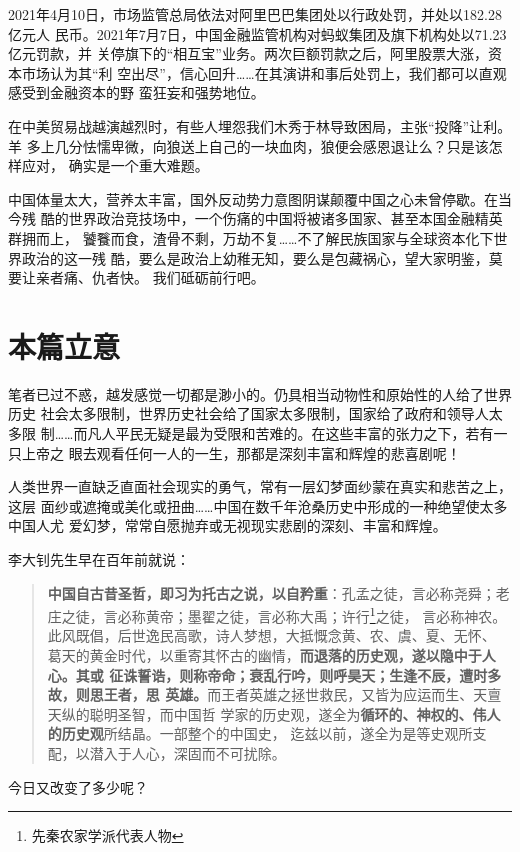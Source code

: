 2021年4月10日，市场监管总局依法对阿里巴巴集团处以行政处罚，并处以182.28亿元人
民币。2021年7月7日，中国金融监管机构对蚂蚁集团及旗下机构处以71.23亿元罚款，并
关停旗下的“相互宝”业务。两次巨额罚款之后，阿里股票大涨，资本市场认为其“利
空出尽”，信心回升……在其演讲和事后处罚上，我们都可以直观感受到金融资本的野
蛮狂妄和强势地位。


在中美贸易战越演越烈时，有些人埋怨我们木秀于林导致困局，主张“投降”让利。羊
多上几分怯懦卑微，向狼送上自己的一块血肉，狼便会感恩退让么？只是该怎样应对，
确实是一个重大难题。

中国体量太大，营养太丰富，国外反动势力意图阴谋颠覆中国之心未曾停歇。在当今残
酷的世界政治竞技场中，一个伤痛的中国将被诸多国家、甚至本国金融精英群拥而上，
饕餮而食，渣骨不剩，万劫不复……不了解民族国家与全球资本化下世界政治的这一残
酷，要么是政治上幼稚无知，要么是包藏祸心，望大家明鉴，莫要让亲者痛、仇者快。
我们砥砺前行吧。

\section{本篇立意}

笔者已过不惑，越发感觉一切都是渺小的。仍具相当动物性和原始性的人给了世界历史
社会太多限制，世界历史社会给了国家太多限制，国家给了政府和领导人太多限
制……而凡人平民无疑是最为受限和苦难的。在这些丰富的张力之下，若有一只上帝之
眼去观看任何一人的一生，那都是深刻丰富和辉煌的悲喜剧呢！


人类世界一直缺乏直面社会现实的勇气，常有一层幻梦面纱蒙在真实和悲苦之上，这层
面纱或遮掩或美化或扭曲……中国在数千年沧桑历史中形成的一种绝望使太多中国人尤
爱幻梦，常常自愿抛弃或无视现实悲剧的深刻、丰富和辉煌。

李大钊先生早在百年前就说：
\begin{quotation}
  \textbf{中国自古昔圣哲，即习为托古之说，以自矜重}：孔孟之徒，言必称尧舜；老
  庄之徒，言必称黄帝；墨翟之徒，言必称大禹；许行\footnote{先秦农家学派代表人物}之徒，
  言必称神农。此风既倡，后世逸民高歌，诗人梦想，大抵慨念黄、农、虞、夏、无怀、
  葛天的黄金时代，以重寄其怀古的幽情，\textbf{而退落的历史观，遂以隐中于人心。其或
    征诛誓诰，则称帝命；衰乱行吟，则呼昊天；生逢不辰，遭时多故，则思王者，思
    英雄。}而王者英雄之拯世救民，又皆为应运而生、天亶天纵的聪明圣智，而中国哲
  学家的历史观，遂全为\textbf{循环的、神权的、伟人的历史观}所结晶。一部整个的中国史，
  迄兹以前，遂全为是等史观所支配，以潜入于人心，深固而不可扰除。
\end{quotation}
今日又改变了多少呢？

